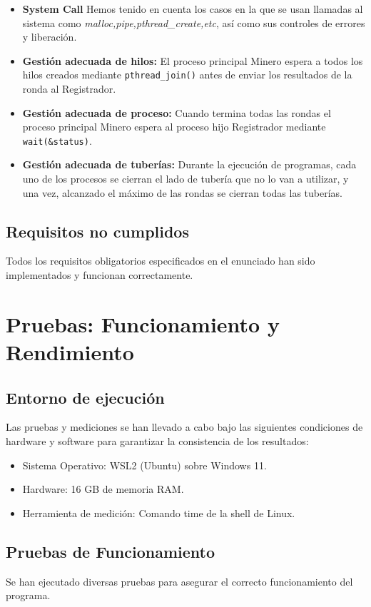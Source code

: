 \documentclass[12pt,a4paper]{article}
\begin{document}
\begin{itemize}
\begin{itemize}
        \item \textbf{System Call} Hemos tenido en cuenta los casos en la que se usan llamadas al sistema como \textit{malloc,pipe,pthread\_create,etc}, así como sus controles de errores y liberación.
        \item \textbf{Gestión adecuada de hilos:} El proceso principal Minero espera a todos los hilos creados mediante \texttt{pthread\_join()} antes de enviar los resultados de la ronda al Registrador.
        \item \textbf{Gestión adecuada de proceso:} Cuando termina todas las rondas el proceso principal Minero espera al proceso hijo Registrador mediante \texttt{wait(\&status)}.
        \item \textbf{Gestión adecuada de tuberías:} Durante la ejecución de programas, cada uno de los procesos se cierran el lado de tubería que no lo van a utilizar, y una vez, alcanzado el máximo de las rondas se cierran todas las tuberías.
    \end{itemize}
   
\end{itemize}

\subsection{Requisitos no cumplidos}
Todos los requisitos obligatorios especificados en el enunciado han sido implementados 
y funcionan correctamente.

\section{Pruebas: Funcionamiento y Rendimiento}
\subsection{Entorno de ejecución}
Las pruebas y mediciones se han llevado a cabo bajo las siguientes condiciones de
hardware y software para garantizar la consistencia de los resultados:
\begin{itemize}
    \item Sistema Operativo: WSL2 (Ubuntu) sobre Windows 11.
    \item Hardware: 16 GB de memoria RAM.
    \item Herramienta de medición: Comando time de la shell de Linux.
\end{itemize}

\subsection{Pruebas de Funcionamiento}
Se han ejecutado diversas pruebas para asegurar el correcto funcionamiento del programa.
\end{document}
